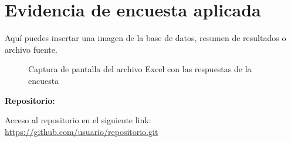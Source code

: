 \documentclass[12pt, a4paper]{article}
\begin{document}
\section{Evidencia de encuesta aplicada}
Aquí puedes insertar una imagen de la base de datos, resumen de resultados o archivo fuente.

\begin{figure}[H]
    \centering
    \caption{Captura de pantalla del archivo Excel con las respuestas de la encuesta}
\end{figure}


\textbf{Repositorio:}  
\label{anexo:repositorio}

Acceso al repositorio en el siguiente link:  
\url{https://github.com/usuario/repositorio.git}
\end{document}
